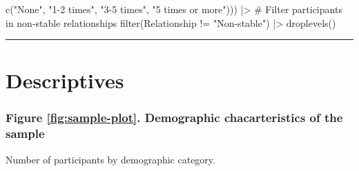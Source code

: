 \documentclass[
  bookmarksnumbered]{article}
\newenvironment{Shaded}{\begin{snugshade}}{\end{snugshade}}
\newcommand{\CommentTok}[1]{\textcolor[rgb]{0.50,0.62,0.50}{#1}}
\newcommand{\FunctionTok}[1]{\textcolor[rgb]{0.94,0.94,0.56}{#1}}
\newcommand{\NormalTok}[1]{\textcolor[rgb]{0.80,0.80,0.80}{#1}}
\newcommand{\SpecialCharTok}[1]{\textcolor[rgb]{0.86,0.64,0.64}{#1}}
\newcommand{\StringTok}[1]{\textcolor[rgb]{0.80,0.58,0.58}{#1}}
\begin{document}
\begin{Shaded}
\begin{Highlighting}[]
                                 \FunctionTok{c}\NormalTok{(}\StringTok{"None"}\NormalTok{, }\StringTok{"1{-}2 times"}\NormalTok{, }
                                   \StringTok{"3{-}5 times"}\NormalTok{, }\StringTok{"5 times or more"}\NormalTok{))) }\SpecialCharTok{|\textgreater{}} 
  \CommentTok{\# Filter participants in non{-}stable relationships}
  \FunctionTok{filter}\NormalTok{(Relationship }\SpecialCharTok{!=} \StringTok{"Non{-}stable"}\NormalTok{) }\SpecialCharTok{|\textgreater{}}
  \FunctionTok{droplevels}\NormalTok{()}
\end{Highlighting}
\end{Shaded}

\begin{center}\rule{0.5\linewidth}{0.5pt}\end{center}

\hypertarget{descriptives}{%
\section{Descriptives}\label{descriptives}}

\hypertarget{figure-reffigsample-plot.-demographic-chacarteristics-of-the-sample}{%
\subsubsection{Figure \ref{fig:sample-plot}. Demographic chacarteristics of the sample}\label{figure-reffigsample-plot.-demographic-chacarteristics-of-the-sample}}

Number of participants by demographic category.
\end{document}
